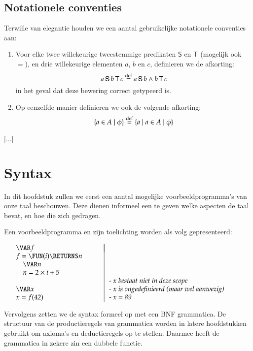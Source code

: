 \documentclass
  [11pt,
   paper=a4,
   cleardouble=plain,
   chapterprefix=true,
   parskip=half]
  {scrbook}
\makeatletter
\def\IN{\quad}
\newcommand{\<}
  {\ensuremath{\langle}}
\renewcommand{\>}
  {\ensuremath{\rangle}}
\newenvironment{SyntaxExample}{%
\vspace{-1.6pc}%
	\begin{equation*}%
		\begin{array}{l@{\hspace*{.02\textwidth}}|@{\hspace*{.02\textwidth}}l}%
		\hspace*{.35\textwidth} & \hspace*{.55\textwidth} \\[-1pc]%
}{%
		\end{array}%
	\end{equation*}%
\vspace{-.6pc}%
}
\makeatother
\begin{document}
\section{Notationele conventies}

Terwille van elegantie houden we een aantal gebruikelijke notationele conventies aan:

\begin{enumerate}
	\item Voor elke twee willekeurige tweestemmige predikaten $\mathsf{S}$ en $\mathsf{T}$ (mogelijk ook $=$), en drie willekeurige elementen $a$, $b$ en $c$, definieren we de afkorting: $$a \operatorname{\mathsf{S}} b \operatorname{\mathsf{T}} c \buildrel{\mathrm{def}}\over{=} a \operatorname{\mathsf{S}} b \land b \operatorname{\mathsf{T}} c$$ in het geval dat deze bewering correct getypeerd is.
	\item Op eenzelfde manier definieren we ook de volgende afkorting: $$ \{a \in A \mid \phi \} \buildrel{\mathrm{def}}\over{=} \{a \mid a \in A \mid \phi\}$$
\end{enumerate}

[...]

\chapter{Syntax}

In dit hoofdstuk zullen we eerst een aantal mogelijke voorbeeldprogramma's van onze taal beschouwen. Deze dienen informeel een te geven welke aspecten de taal bevat, en hoe die zich gedragen.

Een voorbeeldprogramma en zijn toelichting worden als volg gepresenteerd:

	\begin{SyntaxExample}
		\VAR f \\
		f = \FUN(i) \RETURNS n \\
		\IN \VAR n \\
		\IN n = 2 \times i + 5 \\
		& \textit{- x bestaat niet in deze scope} \\
		\VAR x & \textit{- x is ongedefinieerd (maar wel aanwezig)} \\
		x = f(42) & \textit{- x = 89}
	\end{SyntaxExample}

Vervolgens zetten we de syntax formeel op met een BNF grammatica. De structuur van de productieregels van grammatica worden in latere hoofdstukken gebruikt om axioma's en deductieregels op te stellen. Daarmee heeft de grammatica in zekere zin een dubbele functie.
\end{document}
